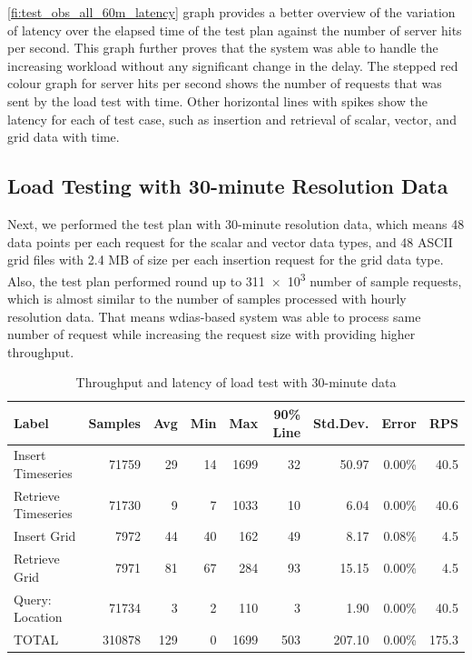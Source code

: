 \cref{fi:test_obs_all_60m_latency} graph provides a better overview of the variation of latency over the elapsed time of the test plan against the number of server hits per second. This graph further proves that the system was able to handle the increasing workload without any significant change in the delay. The stepped red colour graph for server hits per second shows the number of requests that was sent by the load test with time. Other horizontal lines with spikes show the latency for each of test case, such as insertion and retrieval of scalar, vector, and grid data with time.


\subsection{Load Testing with 30-minute Resolution Data}
\label{subse:obs_test_plan_all_30min}

Next, we performed the test plan with 30-minute resolution data, which means 48 data points per each request for the scalar and vector data types, and 48 ASCII grid files with 2.4 MB of size per each insertion request for the grid data type. Also, the test plan performed round up to \num{311e3} number of sample requests, which is almost similar to the number of samples processed with hourly resolution data. That means \acrshort{wdias}-based system was able to process same number of request while increasing the request size with providing higher throughput.

\begin{table}[ht]
\caption{Throughput and latency of load test with 30-minute data}
\footnotesize
\begin{tabulary}{\linewidth}{|L|R|R|R|R|R|R|R|R|}
\hline
\textbf{Label} & \textbf{Samples} & \textbf{Avg} & \textbf{Min} & \textbf{Max} & \textbf{90\% Line} & \textbf{Std.Dev.} & \textbf{Error} & \textbf{RPS} \\ \hline
Insert Timeseries & 71759 & 29 & 14 & 1699 & 32 & 50.97 & 0.00\% & 40.5 \\ \hline
Retrieve Timeseries & 71730 & 9 & 7 & 1033 & 10 & 6.04 & 0.00\% & 40.6 \\ \hline
Insert Grid & 7972 & 44 & 40 & 162 & 49 & 8.17 & 0.08\% & 4.5 \\ \hline
Retrieve Grid & 7971 & 81 & 67 & 284 & 93 & 15.15 & 0.00\% & 4.5 \\ \hline
Query: Location & 71734 & 3 & 2 & 110 & 3 & 1.90 & 0.00\% & 40.5 \\ \hline
TOTAL & 310878 & 129 & 0 & 1699 & 503 & 207.10 & 0.00\% & 175.3 \\ \hline
\end{tabulary}
\label{tab:obs_all_30_min_summary}
\end{table}


